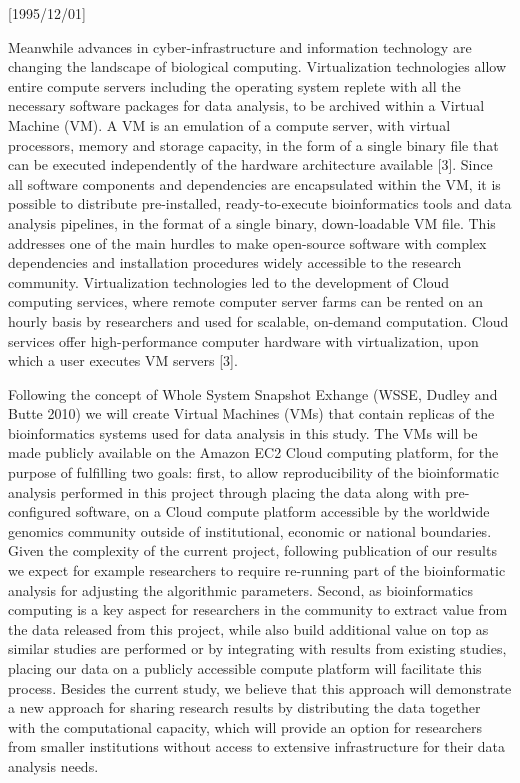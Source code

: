 \NeedsTeXFormat{LaTeX2e}[1995/12/01] \documentclass[10pt]{bmc_article}
\newenvironment{bmcformat}{\begin{raggedright}\baselineskip20pt\sloppy\setboolean{publ}{false}}{\end{raggedright}\baselineskip20pt\sloppy}
\begin{document}
\begin{bmcformat}
Meanwhile advances in cyber-infrastructure and information technology are changing the landscape of biological
computing. Virtualization technologies allow entire compute servers including the operating system replete
with all the necessary software packages for data analysis, to be archived within a Virtual Machine (VM). A VM
is an emulation of a compute server, with virtual processors, memory and storage capacity, in the form of a
single binary file that can be executed independently of the hardware architecture available [3]. Since all
software components and dependencies are encapsulated within the VM, it is possible to distribute
pre-installed, ready-to-execute bioinformatics tools and data analysis pipelines, in the format of a single
binary, down-loadable VM file. This addresses one of the main hurdles to make open-source software with
complex dependencies and installation procedures widely accessible to the research community.  Virtualization
technologies led to the development of Cloud computing services, where remote computer server farms can be
rented on an hourly basis by researchers and used for scalable, on-demand computation. Cloud services offer
high-performance computer hardware with virtualization, upon which a user executes VM servers [3]. 

Following the concept of Whole System Snapshot Exhange (WSSE, Dudley and Butte 2010) we will create Virtual
Machines (VMs) that contain replicas of the bioinformatics systems used for data analysis in this study. The
VMs will be made publicly available on the Amazon EC2 Cloud computing platform, for the purpose of fulfilling
two goals: first, to allow reproducibility of the bioinformatic analysis performed in this project through
placing the data along with pre-configured software, on a Cloud compute platform accessible by the worldwide
genomics community outside of institutional, economic or national boundaries. Given the complexity of  the
current project, following publication of our results we expect for example researchers to require re-running
part of the bioinformatic analysis for adjusting the algorithmic parameters. Second, as bioinformatics
computing is a key aspect for researchers in the community to extract value from the data released from this
project, while also build additional value on top as similar studies are performed or by integrating with
results from existing studies, placing our data on a publicly accessible compute platform will facilitate this
process. Besides the current study, we believe that this approach will demonstrate a new approach for sharing
research results by distributing  the data together with the computational capacity, which will provide an
option for researchers from smaller institutions without access to extensive infrastructure for their data
analysis needs.


\end{bmcformat}
\end{document}
